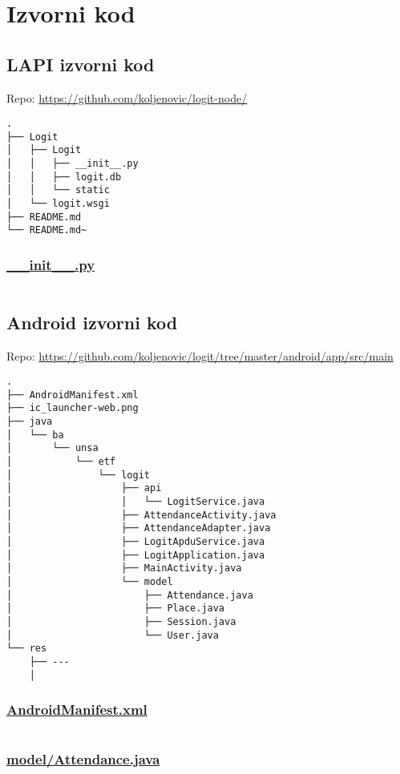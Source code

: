 \chapter{Izvorni kod}
\section{LAPI izvorni kod}
{\small Repo: \url{https://github.com/koljenovic/logit-node/}}
\begin{verbatim}
.
├── Logit
│   ├── Logit
│   │   ├── __init__.py
│   │   ├── logit.db
│   │   └── static
│   └── logit.wsgi
├── README.md
└── README.md~
\end{verbatim}
\subsection{\small \url{__init__.py}}
\inputminted{python}{../logit-node/Logit/Logit/__init__.py}

\section{Android izvorni kod}
{\small Repo: \url{https://github.com/koljenovic/logit/tree/master/android/app/src/main}}
\begin{verbatim}
.
├── AndroidManifest.xml
├── ic_launcher-web.png
├── java
│   └── ba
│       └── unsa
│           └── etf
│               └── logit
│                   ├── api
│                   │   └── LogitService.java
│                   ├── AttendanceActivity.java
│                   ├── AttendanceAdapter.java
│                   ├── LogitApduService.java
│                   ├── LogitApplication.java
│                   ├── MainActivity.java
│                   └── model
│                       ├── Attendance.java
│                       ├── Place.java
│                       ├── Session.java
│                       └── User.java
└── res
    ├── ---
    │ 
\end{verbatim}

\pagebreak[4]
\subsection{\small \url{AndroidManifest.xml}}
\inputminted{xml}{../logit/android/app/src/main/AndroidManifest.xml}

\subsection{\small \url{model/Attendance.java}}
\inputminted{java}{../logit/android/app/src/main/java/ba/unsa/etf/logit/model/Attendance.java}

